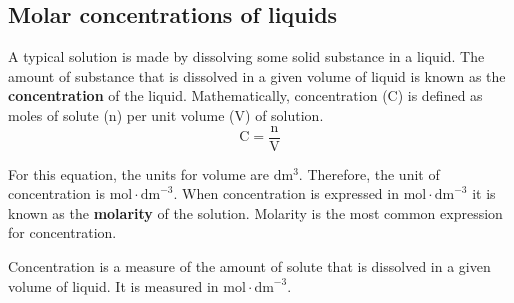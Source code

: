             \subsection*{Molar concentrations of liquids}
            \nopagebreak
      \label{m38712*id282848}A typical solution is made by dissolving some solid substance in a liquid. The amount of substance that is dissolved in a given volume of liquid is known as the \textbf{concentration} of the liquid. Mathematically, concentration (C) is defined as moles of solute (n) per unit volume (V) of solution.
      \label{m38712*id282860}\nopagebreak\noindent{}      
    \begin{equation*}
    \text{C}=\frac{\text{n}}{\text{V}}
      \end{equation*}
	\begin{figure}[H] %
\begin{center}
\end{center}
 \end{figure}
      \label{m38712*id282881}For this equation, the units for volume are $\text{dm}{}^{3}$. Therefore, the unit of concentration is $\text{mol}\ensuremath{\cdot}{\text{dm}}^{-3}$.
When concentration is expressed in $\text{mol}\ensuremath{\cdot}{\text{dm}}^{-3}$ it is known as the \textbf{molarity} of the solution. Molarity is the most common expression for concentration.
	\par
\label{m38712*fhsst!!!underscore!!!id1650}
 { \label{m38712*meaningfhsst!!!underscore!!!id1650}
      \label{m38712*id282955}Concentration is a measure of the amount of solute that is dissolved in a given volume of liquid. It is measured in $\text{mol}\ensuremath{\cdot}{\text{dm}}^{-3}$.} 
\par 
      \noindent

